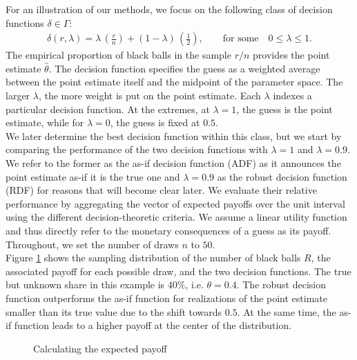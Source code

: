 For an illustration of our methods, we focus on the following class of decision functions $\delta \in \Gamma$:
%
\begin{align*}
 \delta(r, \lambda) = \lambda\,\left(\frac{r}{n}\right)  + (1 - \lambda)\,\left(\frac{1}{2}\right),\qquad\text{for some}\quad 0 \leq \lambda \leq 1.
\end{align*}
%
The empirical proportion of black balls in the sample $r / n$ provides the point estimate $\hat{\theta}$. The decision function specifies the guess as a weighted average between the point estimate itself and the midpoint of the parameter space. The larger $\lambda$, the more weight is put on the point estimate. Each $\lambda$ indexes a particular decision function. At the extremes, at $\lambda = 1$, the guess is the point estimate, while for $\lambda = 0$, the guess is fixed at $0.5$.\\

We later determine the best decision function within this class, but we start by comparing the performance of the two decision functions with $\lambda = 1$ and $\lambda = 0.9$. We refer to the former as the as-if decision function (ADF) as it announces the point estimate as-if it is the true one and $\lambda=0.9$ as the robust decision function (RDF) for reasons that will become clear later. We evaluate their relative performance by aggregating the vector of expected payoffs over the unit interval using the different decision-theoretic criteria. We assume a linear utility function and thus directly refer to the monetary consequences of a guess as its payoff. Throughout, we set the number of draws $n$ to  $50$.\\

Figure \ref{Calculation of expected payoff} shows the sampling distribution of the number of black balls $R$, the associated payoff for each possible draw, and the two decision functions. The true but unknown share in this example is $40\%$, i.e. $\theta = 0.4$. The robust decision function outperforms the as-if function for realizations of the point estimate smaller than its true value due to the shift towards $0.5$. At the same time, the as-if function leads to a higher payoff at the center of the distribution.\\

\begin{figure}[h!]\centering
{}
\caption{Calculating the expected payoff}\label{Calculation of expected payoff}
\end{figure}\FloatBarrier

